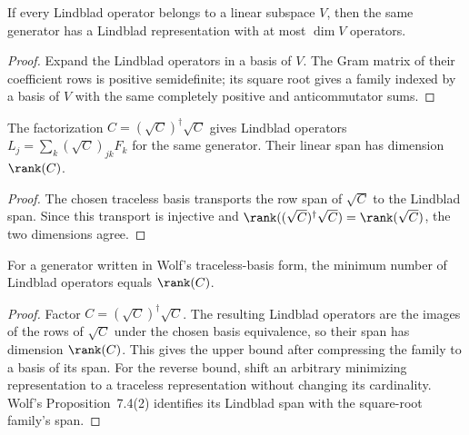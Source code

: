 \begin{lemma}
    \label{lem:lindblad_family_rank_compression}
    \leanok
    If every Lindblad operator belongs to a linear subspace $V$, then the
    same generator has a Lindblad representation with at most $\dim V$
    operators.
\end{lemma}

\begin{proof}\leanok
    Expand the Lindblad operators in a basis of $V$.  The Gram matrix of
    their coefficient rows is positive semidefinite; its square root gives a
    family indexed by a basis of $V$ with the same completely positive and
    anticommutator sums.
\end{proof}

\begin{lemma}
    \label{lem:kossakowski_sqrt_lindblad_span}
    \leanok
    The factorization $C=(\sqrt C)^\dagger\sqrt C$ gives Lindblad operators
    $L_j=\sum_k(\sqrt C)_{jk}F_k$ for the same generator. Their linear span
    has dimension $\rank(C)$.
\end{lemma}

\begin{proof}\leanok
    The chosen traceless basis transports the row span of $\sqrt C$ to the
    Lindblad span.  Since this transport is injective and
    $\rank((\sqrt C)^\dagger\sqrt C)=\rank(\sqrt C)$, the two dimensions
    agree.
\end{proof}

\begin{theorem}
    \label{thm:kossakowski_rank_eq_matrix_rank}
    \leanok
    For a generator written in Wolf's traceless-basis form, the minimum
    number of Lindblad operators equals $\rank(C)$.
\end{theorem}

\begin{proof}\leanok
    Factor $C=(\sqrt C)^\dagger\sqrt C$.  The resulting Lindblad operators
    are the images of the rows of $\sqrt C$ under the chosen basis
    equivalence, so their span has dimension $\rank(C)$.  This gives the
    upper bound after compressing the family to a basis of its span.  For the
    reverse bound, shift an arbitrary minimizing representation to a
    traceless representation without changing its cardinality.  Wolf's
    Proposition~7.4(2) identifies its Lindblad span with the square-root
    family's span.
\end{proof}

